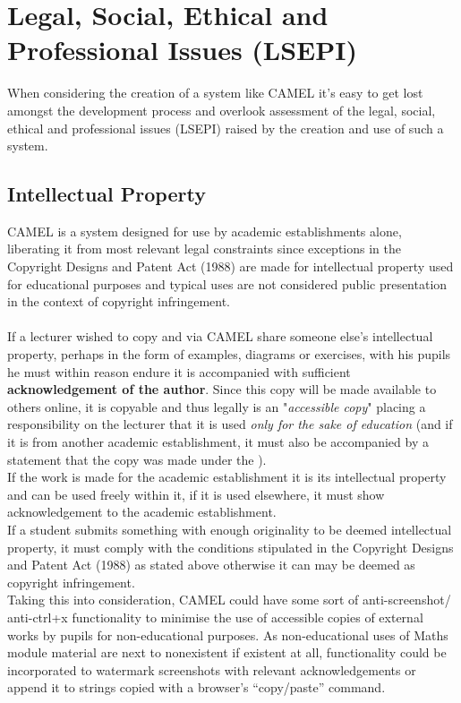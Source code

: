 \newpage
\section{Legal, Social, Ethical and Professional Issues (LSEPI)}
    When considering the creation of a system like CAMEL it’s easy to get lost amongst the development process and overlook assessment of the legal, social, ethical and professional issues (LSEPI) raised by the creation and use of such a system.
\subsection*{Intellectual Property}
CAMEL is a system designed for use by academic establishments alone, liberating it from most relevant legal constraints since exceptions in the Copyright Designs and Patent Act (1988) are made for intellectual property used for educational purposes and typical uses are not considered public presentation in the context of copyright infringement.
\\\\If a lecturer wished to copy and via CAMEL share someone else's intellectual property, perhaps in the form of examples, diagrams or exercises, with his pupils he must within reason endure it is accompanied with sufficient \textbf{acknowledgement of the author}. Since this copy will be made available to others online, it is copyable and thus legally is an "\textit{accessible copy}" placing a responsibility on the lecturer that it is used \emph{only for the sake of education} (and if it is from another academic establishment, it must also be accompanied by a statement that the copy was made under the \cite[(Pt 1, Ch 3, §31B)]{CDaPA}).
\\If the work is made for the academic establishment it is its intellectual property and can be used freely within it, if it is used elsewhere, it must show acknowledgement to the academic establishment.
\\If a student submits something with enough originality to be deemed intellectual property, it must comply with the conditions stipulated in the Copyright Designs and Patent Act (1988) as stated above otherwise it can may be deemed as copyright infringement.
\\Taking this into consideration, CAMEL could have some sort of anti-screenshot/ anti-ctrl+x functionality to minimise the use of accessible copies of external works by pupils for non-educational purposes. As non-educational uses of Maths module material are next to nonexistent if existent at all, functionality could be incorporated to watermark screenshots with relevant acknowledgements or append it to strings copied with a browser’s “copy/paste” command.
